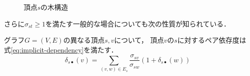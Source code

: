 \begin{figure}[tb]
  \centering
  \def\svgwidth{.35\linewidth}
  
  \caption{頂点$s$の木構造}
  \label{fig:implicit-dependency-1}
\end{figure}

さらに$\sigma_{st}\geq 1$を満たす一般的な場合についても次の性質が知られている．

\begin{theorem}
  \label{th:implicit-dependency}
  グラフ$G=(V,E)$の異なる頂点$s,v$について，
  頂点$v$の$s$に対するペア依存度は式\eqref{eq:implicit-dependency}を満たす．
  \begin{equation}
    \label{eq:implicit-dependency}
    \delta_{s\bullet}(v)=\sum_{(v,w)\in E_s}\frac{\sigma_{sv}}{\sigma_{sw}}(1+\delta_{s\bullet}(w))
  \end{equation}
\end{theorem}
